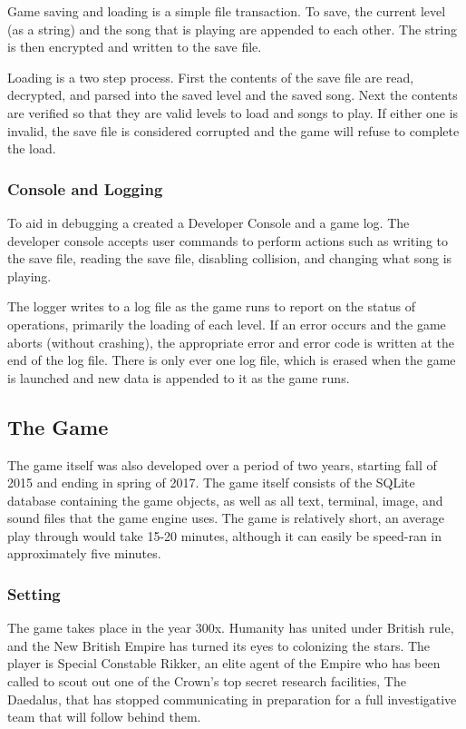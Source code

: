 \documentclass{article}
\begin{document}
Game saving and loading is a simple file transaction. To save, the current level (as a string) and the song that is playing are appended to each other. The string is then encrypted and written to the save file.

Loading is a two step process. First the contents of the save file are read, decrypted, and parsed into the saved level and the saved song. Next the contents are verified so that they are valid levels to load and songs to play. If either one is invalid, the save file is considered corrupted and the game will refuse to complete the load.

\subsubsection{Console and Logging} \label{subsubsec:console}

To aid in debugging a created a Developer Console and a game log. The developer console accepts user commands to perform actions such as writing to the save file, reading the save file, disabling collision, and changing what song is playing.

The logger writes to a log file as the game runs to report on the status of operations, primarily the loading of each level. If an error occurs and the game aborts (without crashing), the appropriate error and error code is written at the end of the log file. There is only ever one log file, which is erased when the game is launched and new data is appended to it as the game runs.

\subsection{The Game} \label{subsec:thegame}

The game itself was also developed over a period of two years, starting fall of 2015 and ending in spring of 2017. The game itself consists of the SQLite database containing the game objects, as well as all text, terminal, image, and sound files that the game engine uses. The game is relatively short, an average play through would take 15-20 minutes, although it can easily be speed-ran in approximately five minutes.

\subsubsection{Setting} \label{subsubsec:setting}

The game takes place in the year 300x. Humanity has united under British rule, and the New British Empire has turned its eyes to colonizing the stars. The player is Special Constable Rikker, an elite agent of the Empire who has been called to scout out one of the Crown's top secret research facilities, The Daedalus, that has stopped communicating in preparation for a full investigative team that will follow behind them.
\end{document}
